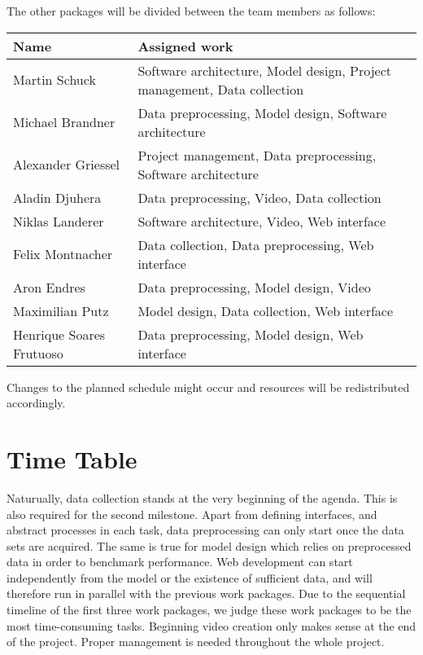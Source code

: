 \documentclass[s=english,inputenc=utf8,fontsize=10pt]{ldvarticle}
\begin{document}
The other packages will be divided between the team members as follows:
\begin{center}
	\begin{footnotesize}
		\setlength{\arrayrulewidth}{1,05pt}
		\begin{tabular}[htb]{|p{3cm}|p{9.1cm}|}
			\hline
			\textbf{Name} & \textbf{Assigned work} \\
			\hline
			\hline
			\rowcolor{lightgray} Martin Schuck & Software architecture, Model design, Project management, Data collection \\
			\hline
			\rowcolor{lightgray} Michael Brandner & Data preprocessing, Model design, Software architecture \\
			\hline	
			\rowcolor{lightgray} Alexander Griessel & Project management, Data preprocessing, Software architecture \\
			\hline
			\rowcolor{lightgray} Aladin Djuhera & Data preprocessing, Video, Data collection \\
			\hline
			\rowcolor{lightgray} Niklas Landerer & Software architecture, Video, Web interface\\
			\hline
			\rowcolor{lightgray} Felix Montnacher & Data collection, Data preprocessing, Web interface\\
			\hline	
			\rowcolor{lightgray} Aron Endres & Data preprocessing, Model design, Video \\
			\hline
			\rowcolor{lightgray} Maximilian Putz & Model design, Data collection, Web interface \\
			\hline
			\rowcolor{lightgray} Henrique Soares Frutuoso & Data preprocessing, Model design, Web interface \\
			\hline
		\end{tabular}
	\end{footnotesize}
\end{center}
Changes to the planned schedule might occur and resources will be redistributed accordingly.
\newpage

\section{Time Table}

Naturually, data collection stands at the very beginning of the agenda. This is also required for the second milestone. Apart from defining interfaces, and abstract processes in each task, data preprocessing can only start once the data sets are acquired. The same is true for model design which relies on preprocessed data in order to benchmark performance. Web development can start independently from the model or the existence of sufficient data, and will therefore run in parallel with the previous work packages. Due to the sequential timeline of the first three work packages, we judge these work packages to be the most time-consuming tasks. Beginning video creation only makes sense at the end of the project. Proper management is needed throughout the whole project.
\end{document}
